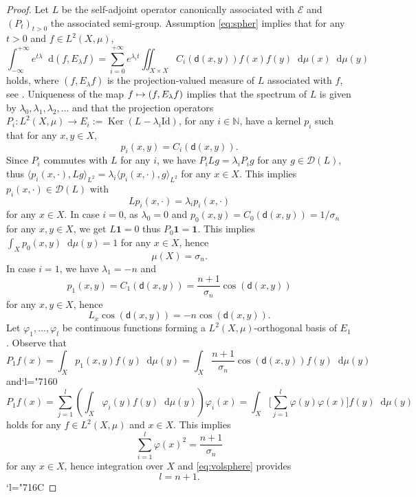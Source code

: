 \documentclass[10pt]{amsart}
\newcommand\mto{\mathchoice{\longmapsto}{\mapsto}{\mapsto}{\mapsto}}
\DeclareMathOperator{\Ker}{Ker}
\newcommand{\Changel}{\mathcode`l="7160}
\newcommand{\Changelback}{\mathcode`l="716C}
\theoremstyle{plain}
\theoremstyle{definition}
\newcommand{\setN}{\mathbb{N}}
\newcommand{\cE}{\mathcal{E}}
\newcommand{\cD}{\mathcal{D}}
\let\phi\varphi
\newcommand{\di}{\mathop{}\!\mathrm{d}}
\newcommand{\dist}{\mathsf{d}}
\begin{document}
\begin{proof}
Let $L$ be the self-adjoint operator canonically associated with $\cE$ and $(P_t)_{t>0}$ the associated semi-group. Assumption \eqref{eq:spher} implies that for any $t>0$ and $f \in L^2(X,\mu)$,
\[
\int_{-\infty}^{+\infty} e^{t \lambda} \di (f,E_\lambda f) = \sum_{i=0}^{+\infty} e^{\lambda_i t} \iint_{X\times X} C_i(\dist(x,y)) f(x) f(y) \di \mu(x) \di \mu(y)
\]
holds, where $(f,E_\lambda f)$ is the projection-valued measure of $L$ associated with $f$, see \eg \cite[p.\,262--263]{ReedSimon}. Uniqueness of the map $f \mto (f,E_\lambda f)$ implies that the spectrum of $L$ is given by $\lambda_0, \lambda_1, \lambda_2, \ldots$ and that the projection operators $P_i: L^2(X,\mu) \to E_i:=\Ker(L-\lambda_i \mathrm{Id})$, for any $i \in \setN$, have a kernel $p_i$ such that for any $x,y \in X$,
\[
p_i(x,y)=C_i(\dist(x,y)).
\]
Since $P_i$ commutes with $L$ for any $i$, we have $P_i Lg = \lambda_i P_i g$ for any $g \in \cD(L)$, thus $
\langle p_i(x,\cdot), Lg \rangle_{L^2} = \lambda_i \langle p_i(x,\cdot), g \rangle_{L^2}$
for any $x \in X$. This implies $p_i(x,\cdot) \in \cD(L)$ with
\[
Lp_i(x,\cdot)=\lambda_i p_i(x,\cdot)
\]
for any $x \in X$. In case $i=0$, as $\lambda_0=0$ and $p_0(x,y)=C_0(\dist(x,y))=1/\sigma_n$ for any $x, y \in X$, we get $L\textbf{1}=0$ thus $P_0 \textbf{1}=\textbf{1}$. This implies $\int_Xp_0(x,y) \di \mu(y)=1$ for any $x \in X$, hence
\begin{equation}\label{eq:volsphere}
\mu(X) = \sigma_n.
\end{equation}
In case $i=1$, we have $\lambda_1=-n$ and
\[
p_1(x,y)=C_1(\dist(x,y))=\frac{n+1}{\sigma_n} \cos(\dist(x,y))
\]
for any $x,y \in X$, hence
\begin{equation}\label{eq:cosdist}
L_x\cos(\dist(x,y)) = - n \cos(\dist(x,y)).
\end{equation}
Let $\phi_1,\ldots, \phi_l$ be continuous functions forming a $L^2(X,\mu)$-orthogonal basis of $E_1$. Observe that
\begin{equation}\label{eq:p1}
P_1f(x) = \int_X p_1(x,y) f(y) \di \mu(y) = \int_X\frac{n+1}{\sigma_n} \cos(\dist(x,y)) f(y) \di \mu(y)
\end{equation}
and\Changel
\[
P_1f(x)=\sum_{j=1}^l \left(\int_X \phi_i(y) f(y) \di \mu(y)\right)\phi_i(x)= \int_X \biggl[\sum_{j=1}^l \phi(y)\phi(x)\biggr] f(y)\di \mu(y)
\]
holds for any $f \in L^2(X,\mu)$ and $x \in X$. This implies
\[
\sum_{i=1}^l\phi(x)^2 = \frac{n+1}{\sigma_n}
\]
for any $x \in X$, hence integration over $X$ and \eqref{eq:volsphere} provides
\[
l=n+1.
\]
\Changelback

\end{proof}
\end{document}
